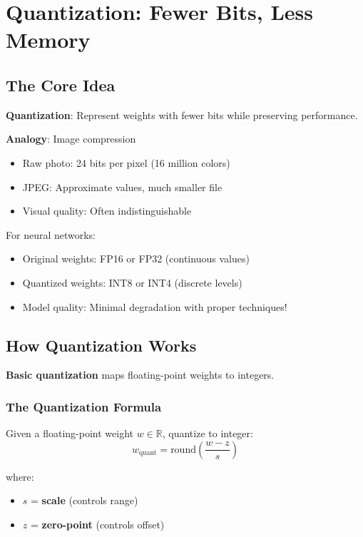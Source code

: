 \documentclass{article}
\begin{document}
\section{Quantization: Fewer Bits, Less Memory}

\subsection{The Core Idea}

\textbf{Quantization}: Represent weights with fewer bits while preserving performance.

\textbf{Analogy}: Image compression
\begin{itemize}
\item Raw photo: 24 bits per pixel (16 million colors)
\item JPEG: Approximate values, much smaller file
\item Visual quality: Often indistinguishable
\end{itemize}

For neural networks:
\begin{itemize}
\item Original weights: FP16 or FP32 (continuous values)
\item Quantized weights: INT8 or INT4 (discrete levels)
\item Model quality: Minimal degradation with proper techniques!
\end{itemize}

\subsection{How Quantization Works}

\textbf{Basic quantization} maps floating-point weights to integers.

\begin{center}
\end{center}

\subsubsection{The Quantization Formula}

Given a floating-point weight $w \in \mathbb{R}$, quantize to integer:
\[
w_{\text{quant}} = \text{round}\left(\frac{w - z}{s}\right)
\]

where:
\begin{itemize}
\item $s$ = \textbf{scale} (controls range)
\item $z$ = \textbf{zero-point} (controls offset)
\end{itemize}
\end{document}
